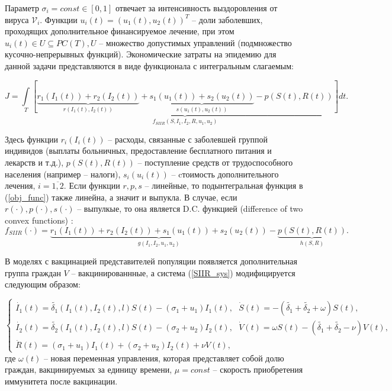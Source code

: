 Параметр $\sigma_i = const \in [0,1]$ отвечает за интенсивность выздоровления от вируса $\mathcal{V}_i$. Функции $u_i(t) = \left(  u_1(t), u_2(t) \right) ^ T$ -- доли заболевших, проходящих дополнительное финансируемое лечение, при этом $u_i(t) \in U \subseteq PC(T), U$ -- множество допустимых управлений (подмножество кусочно-непрерывных функций). Экономические затраты на эпидемию для данной задачи представляются в виде функционала с интегральным слагаемым:

\begin{equation}\label{obj_func}
    J = \int\limits_T \underbrace{\left[\underbrace{r_1(I_1(t)) + r_2(I_2(t))}_{r(I_1(t),I_2(t))} +\underbrace{s_1(u_1(t)) + s_2(u_2(t))}_{s(u_1(t),u_2(t))} - p(S(t),R(t)) \right]}_{f_{SIIR}(S,I_1,I_2,R,u_1,u_2)}dt.
\end{equation}

Здесь функции $r_i(I_i(t))$ -- расходы, связанные с заболевшей группой индивидов (выплаты больничных, предоставление бесплатного питания и лекарств и т.д.), $p(S(t),R(t))$ -- поступление средств от трудоспособного населения (например -- налоги), $s_i(u_i(t))$ -- cтоимость дополнительного лечения, $i=\overline{1,2}$. Если функции $r, p, s$ -- линейные, то подынтегральная функция в (\ref{obj_func}) также линейна, а значит и выпукла. В случае, если $r(\cdot), p(\cdot), s(\cdot)$ -- выпулкые, то она является D.C. функцией (difference of two convex functions) \cite{pshen,alexan}:
\begin{equation}\label{obj_func}
    f_{SIIR}(\cdot) = \underbrace{r_1(I_1(t)) + r_2(I_2(t)) + s_1(u_1(t)) + s_2(u_2(t))}_{g(I_1, I_2, u_1, u_2)} - \underbrace{p(S(t),R(t))}_{h(S,R)}.
\end{equation}

В моделях с вакцинацией представителей популяции появляется дополнительная группа граждан $V$ -- вакцинированнные, а система (\ref{SIIR_sys}) модифицируется следующим образом:

\begin{equation}\label{SVIIR_sys}\tag{1*}
	\begin{cases}
        \dot{I_1}(t)=\widetilde{\delta_1}(I_1(t),I_2(t),l) S(t) - (\sigma_1 + u_1)I_1(t), 
        \ \ \
		\dot{S}(t)=-(\widetilde{\delta_1} + \widetilde{\delta_2} + \omega)S(t), \\
        \dot{I_2}(t)=\widetilde{\delta_2}(I_1(t),I_2(t),l) S(t) - (\sigma_2 + u_2)I_2(t),
        \ \ \
        \dot{V}(t)=\omega S(t) - (\widetilde{\delta_1} + \widetilde{\delta_2} - \nu)V(t), \\
        \dot{R}(t)=(\sigma_1+u_1) I_1(t)+(\sigma_2+u_2 )I_2(t) + \nu V(t),
	\end{cases}
\end{equation}
где $\omega(t)$ -- новая переменная управления, которая представляет собой долю граждан, вакцинируемых за единицу времени, $\mu = const$ -- скорость приобретения иммунитета после вакцинации.

